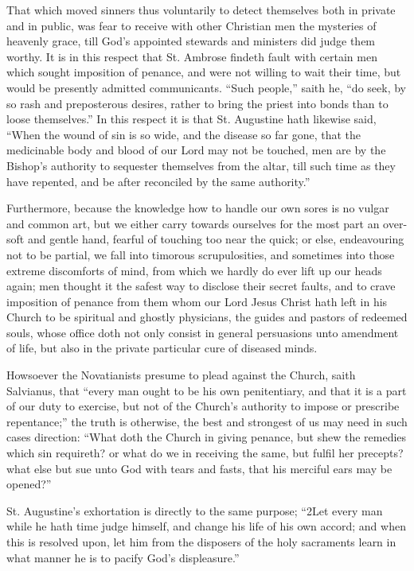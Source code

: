 That which moved sinners thus voluntarily to detect themselves both in private and in public, was fear to receive with other Christian men the mysteries of heavenly grace, till God’s appointed stewards and ministers did judge them worthy. It is in this respect that St. Ambrose findeth fault with certain men which sought imposition of penance, and were not willing to wait their time, but would be presently admitted communicants. “Such people,” saith he, “do seek, by so rash and preposterous desires, rather to bring the priest into bonds than to loose themselves.” In this respect it is that St. Augustine hath likewise said, “When  the wound of sin is so wide, and the disease so far gone, that the medicinable body and blood of our Lord may not be touched, men are by the Bishop’s authority to sequester themselves from the altar, till such time as they have repented, and be after reconciled by the same authority.”

Furthermore, because the knowledge how to handle our own sores is no vulgar and common art, but we either carry towards ourselves for the most part an over-soft and gentle hand, fearful of touching too near the quick; or else, endeavouring not to be partial, we fall into timorous scrupulosities, and sometimes into those extreme discomforts of mind, from which we hardly do ever lift up our heads again; men thought it the safest way to disclose their secret faults, and to crave imposition of penance from them whom our Lord Jesus Christ hath left in his Church to be spiritual and ghostly physicians, the guides and pastors of redeemed souls, whose office doth not only consist in general persuasions unto amendment of life, but also in the private particular cure of diseased minds.

Howsoever the Novatianists presume to plead against the Church, saith Salvianus, that “every man ought to be his own penitentiary, and that it is a part of our duty to exercise, but not of the Church’s authority to impose or prescribe repentance;” the truth is otherwise, the best and strongest of us may need in such cases direction: “What doth the Church in giving penance, but shew the remedies which sin requireth? or what do we in receiving the same, but fulfil her precepts? what else but sue unto God with tears and fasts, that his merciful ears may be opened?”

St. Augustine’s exhortation is directly to the same purpose; “2Let every man while he hath time judge himself, and  change his life of his own accord; and when this is resolved upon, let him from the disposers of the holy sacraments learn in what manner he is to pacify God’s displeasure.”

